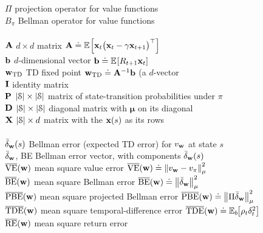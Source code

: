 \documentclass[10pt,fleqn]{article}
\begin{document}
\begin{tabbing}
\>$\Pi$               \> projection operator for value functions \\
\>$B_\pi$             \> Bellman operator for value functions \\
\\
\>${\bf A}$           \> $d\times d$ matrix ${\bf A}\defeq\E{\x_t\bigl(\x_t-\g\x_{t+1}\bigr)\tr}$\\
\>${\bf b}$           \> $d$-dimensional vector ${\bf b}\defeq\E{R_{t+1}\x_t}$\\
\>$\w_{\rm TD}$       \> TD fixed point $\w_{\rm TD}\defeq {\bf A}^{-1}{\bf b}$ (a $d$-vector\\
\>${\bf I}$           \> identity matrix\\
\>${\bf P}$           \> $|\S|\times |\S|$ matrix of state-transition probabilities under $\pi$\\
\>${\bf D}$           \> $|\S|\times |\S|$ diagonal matrix with $\bm\mu$ on its diagonal\\
\>${\bf X}$           \> $|\S|\times d$ matrix with the $\x(s)$ as its rows\\
\\
\>$\bar\delta_\w(s)$  \> Bellman error (expected TD error) for $v_\w$ at state $s$\\
\>$\bar\delta_\w$, BE \> Bellman error vector, with components $\bar\delta_\w(s)$\\
\>$\MSVEm(\w)$        \> mean square value error $\MSVEm(\w)\defeq\norm{v_\w-\vpi}$\\
\>$\MSBEm(\w)$        \> mean square Bellman error $\MSBEm(\w)\defeq\norm{\bar\delta_\w}$\\
\>$\MSPBEm(\w)$       \> mean square projected Bellman error $\MSPBEm(\w)\defeq\norm{\Pi\bar\delta_\w}$\\
\>$\MSTDEm(\w)$       \> mean square temporal-difference error $\MSTDEm(\w)\defeq\EE{b}{\rho_t\delta_t^2}$ \\
\>$\MSREm(\w)$        \> mean square return error\\
\end{tabbing}
\end{document}
